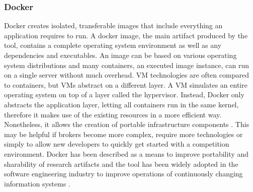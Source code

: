 
\subsubsection{Docker}
\label{sub:docker}

Docker creates isolated, transferable images that include everything an application requires to run. A docker image, the
main artifact produced by the tool, contains a complete operating system environment as well as any dependencies and
executables. An
image can be based on various operating system distributions and many containers, an executed image instance, can run on a single server without much overhead.
\ac{VM} technologies are often compared to containers, but \ac{VM}s abstract on a different layer. A \ac{VM} simulates
an entire operating system on top of a layer called the hypervisor. Instead, Docker only abstracts the application
layer, letting all containers run in the same kernel, therefore it makes use of the existing resources in a more
efficient way. Nonetheless, it allows the creation of portable infrastructure components
\cite[]{boettiger2015introduction, docker}. This may be helpful if brokers become more complex, require more
technologies or simply to allow new developers to quickly get started with a competition environment. Docker has been
described as a means to improve portability and sharability of research artifacts and the tool has been widely adopted
in the software engineering industry to improve operations of continuously changing information systems
\citep{boettiger2015introduction}.

